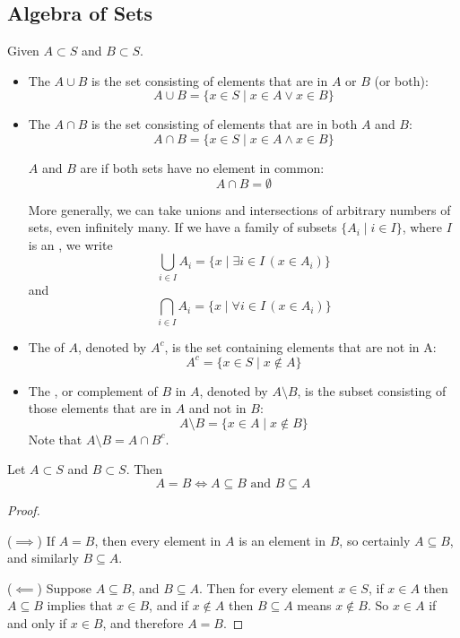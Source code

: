 \subsection{Algebra of Sets}
Given $A \subset S$ and $B \subset S$.
\begin{itemize}
\item The  $A \cup B$ is the set consisting of elements that are in $A$ or $B$ (or both):
\[ A\cup B=\{x \in S \mid x\in A \lor x\in B\} \]

\item The  $A \cap B$ is the set consisting of elements that are in both $A$ and $B$:
\[ A\cap B=\{x \in S \mid x\in A \land x\in B\} \]

$A$ and $B$ are  if both sets have no element in common:
\[ A\cap B = \emptyset \]

More generally, we can take unions and intersections of arbitrary numbers of sets, even infinitely many. If we have a family of subsets $\{A_i \mid i \in I\}$, where $I$ is an , we write
\[ \bigcup_{i\in I} A_i = \{x \mid \exists i\in I\,(x\in A_i)\} \]
and
\[ \bigcap_{i\in I} A_i = \{x \mid \forall i\in I\,(x\in A_i)\} \] 

\item The  of $A$, denoted by $A^c$, is the set containing elements that are not in A:
\[ A^c = \{x \in S \mid x \notin A\} \]

\item The , or complement of $B$ in $A$, denoted by $A\setminus B$, is the subset consisting of those elements that are in $A$ and not in $B$:
\[ A\setminus B = \{x \in A \mid x \notin B\} \]
Note that $A\setminus B = A \cap B^c$.
\end{itemize}

\begin{proposition}
Let $A\subset S$ and $B\subset S$. Then 
\begin{equation}
A = B \iff A \subseteq B \text{ and } B \subseteq A
\end{equation}
\end{proposition}

\begin{proof} \

($\implies$) If $A = B$, then every element in $A$ is an element in $B$, so certainly $A \subseteq B$, and
similarly $B \subseteq A$. 

($\impliedby$) Suppose $A \subseteq B$, and $B \subseteq A$. Then for every element $x \in S$, if $x \in A$ then $A \subseteq B$ implies that $x \in B$, and if $x \notin A$ then $B \subseteq A$ means $x \notin B$. So $x \in A$ if and only if $x \in B$, and therefore $A = B$.
\end{proof}

